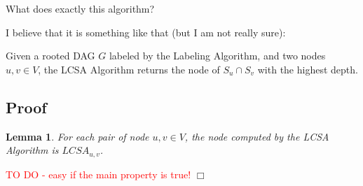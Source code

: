 \documentclass{paper}
\newtheorem{lemma}{Lemma}
\newenvironment{proof}{{\noindent\bf Proof. } }{{\hfill $\Box$}}
\begin{document}
{\color{red}What does exactly this algorithm?

I believe that it is something like that (but I am not really sure):

Given a rooted DAG $G$ labeled by the Labeling Algorithm, and two nodes $u,v\in V$, the LCSA Algorithm returns the node of $S_u\cap S_v$ with the highest depth.
}

\subsection{Proof}

\begin{lemma}
For each pair of node $u,v\in V$, the node computed by the LCSA Algorithm is $LCSA_{u,v}$.
\end{lemma}

\begin{proof}
\textcolor{red}{TO DO - easy if the main property is true!}
\end{proof}
\end{document}
